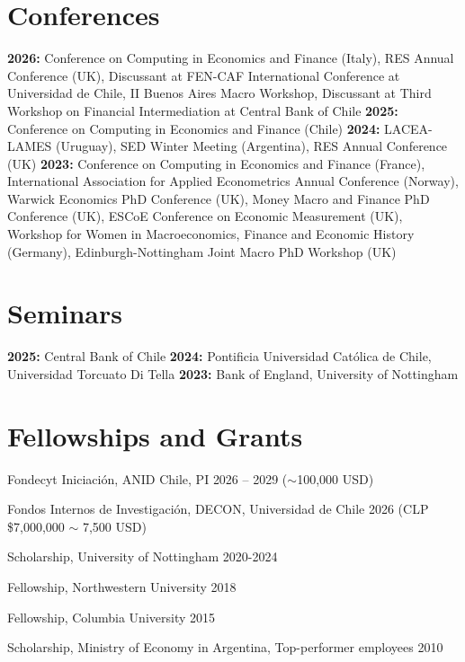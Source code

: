 \documentclass[11pt,letterpaper]{article}%
\begin{document}
\section*{Conferences}
\vspace{-0.2cm}
\noindent\textbf{2026:} Conference on Computing in Economics and Finance (Italy), RES Annual Conference (UK), Discussant at FEN-CAF International Conference at Universidad de Chile, II Buenos Aires Macro Workshop, Discussant at Third Workshop on Financial Intermediation at Central Bank of Chile \bigbreak \vspace{-0.1cm}
\noindent\textbf{2025:} Conference on Computing in Economics and Finance (Chile) \bigbreak \vspace{-0.1cm}
\noindent\textbf{2024:} LACEA-LAMES (Uruguay), SED Winter Meeting (Argentina), RES Annual Conference (UK) \bigbreak \vspace{-0.1cm}
\noindent\textbf{2023:} Conference on Computing in Economics and Finance (France), International Association for Applied Econometrics Annual Conference (Norway), Warwick Economics PhD Conference (UK), Money Macro and Finance PhD Conference (UK), ESCoE Conference on Economic Measurement (UK), Workshop for Women in Macroeconomics, Finance and Economic History (Germany), Edinburgh-Nottingham Joint Macro PhD Workshop (UK)

\vspace{0.1cm}
\section*{Seminars}
\vspace{-0.2cm}
\noindent\textbf{2025:} Central Bank of Chile \bigbreak \vspace{-0.1cm}
\noindent\textbf{2024:} Pontificia Universidad Católica de Chile, Universidad Torcuato Di Tella \bigbreak \vspace{-0.1cm}
\noindent\textbf{2023:} Bank of England, University of Nottingham


\vspace{0.1cm}
\section*{Fellowships and Grants}
\vspace{-0.2cm}
\begin{list}{}{} 
\itemindent=-15pt
\setlength\itemsep{-0.1cm}
\item Fondecyt Iniciación, ANID Chile, PI \hfill {2026 -- 2029 ($\sim$100,000 USD)}
\item Fondos Internos de Investigación, DECON, Universidad de Chile \hfill {2026 (CLP \$7,000,000 $\sim$ 7,500 USD)}
\item Scholarship, University of Nottingham \hfill 2020-2024
\item Fellowship, Northwestern University \hfill 2018
\item Fellowship, Columbia University \hfill2015
\item Scholarship, Ministry of Economy in Argentina, Top-performer employees \hfill 2010
\end{list}	
\end{document}

